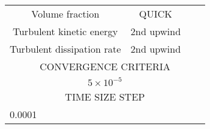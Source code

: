 \begin{table}[htbp]
\begin{tabular}{cccc}
    \multicolumn{1}{p{10em}}{Volume fraction} & \multicolumn{1}{p{14.415em}}{QUICK} &       &  \\
    \multicolumn{1}{p{10em}}{Turbulent kinetic energy} & \multicolumn{1}{p{14.415em}}{2nd upwind} &       &  \\
    \multicolumn{1}{p{10em}}{Turbulent dissipation rate} & \multicolumn{1}{p{14.415em}}{2nd upwind} &       &  \\
    \midrule
    \multicolumn{4}{p{43.665em}}{CONVERGENCE CRITERIA} \\
    \midrule
    \multicolumn{4}{p{43.665em}}{$5\times10^{-5}$} \\
    \midrule
    \multicolumn{4}{p{43.665em}}{TIME SIZE STEP } \\
    \midrule
    \multicolumn{4}{l}{0.0001} \\
    \bottomrule
    \end{tabular}%
  \label{tab: setups aug 13 2019}%
\end{table}%
  